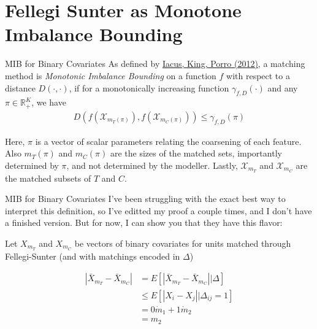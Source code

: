\documentclass{beamer}
\begin{document}
\section{Fellegi Sunter as Monotone Imbalance Bounding}

%	

\begin{frame}{MIB for Binary Covariates}
	As defined by \href{https://gking.harvard.edu/files/gking/files/cem_jasa.pdf}{Iacus, King, Porro (2012)}, a matching method is \emph{Monotonic Imbalance Bounding} on a function $f$ with respect to a distance $D(\cdot, \cdot)$, if for a monotonically increasing function $\gamma_{f, D}(\cdot)$ and any $\pi \in \mathbb{R}_{+}^K$, we have
	\begin{align*}
		D(f(\mathcal{X}_{m_T(\pi)}), f(\mathcal{X}_{m_C(\pi)})) \leq \gamma_{f, D}(\pi)
	\end{align*}

Here, $\pi$ is a vector of scalar parameters relating the coarsening of each feature. Also ${m_T(\pi)}$ and ${m_C(\pi)}$ are the sizes of the matched sets, importantly determined by $\pi$, and not determined by the modeller. Lastly, $\mathcal{X}_{m_T}$ and $\mathcal{X}_{m_C}$ are the matched subsets of $T$ and $C$.
\end{frame}

\begin{frame}{MIB for Binary Covariates}
	I've been struggling with the exact best way to interpret this definition, so I've editted my proof a couple times, and I don't have a finished version. But for now, I can show you that they have this flavor: \linebreak
	
	Let $X_{m_T}$ and $X_{m_C}$ be vectors of binary covariates for units matched through Fellegi-Sunter (and with matchings encoded in $\Delta$)
	
	\begin{align*}
		|\bar{X}_{m_T} - \bar{X}_{m_C}| &= E[|\bar{X}_{m_T} - \bar{X}_{m_C}|| \Delta] \\
		&\leq E[|X_i - X_j| | \Delta_{ij} = 1] \\
		&= 0 \dot m_{1} + 1 \dot m_{2} \\
		&=m_{2}
	\end{align*}
\end{frame}
\end{document}
